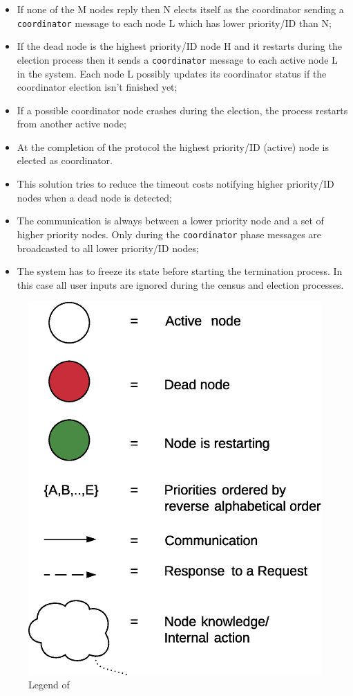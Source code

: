\begin{itemize}
  \item If none of the M nodes reply then N elects itself as the coordinator sending a \texttt{coordinator} message to each node L which has lower priority/ID than N;
  \item If the dead node is the highest priority/ID node H and it restarts during the election process then it sends a \texttt{coordinator} message to each active node L in the system. Each node L possibly updates its coordinator status if the coordinator election isn't finished yet;
  \item If a possible coordinator node crashes during the election, the process restarts from another active node;
  \item At the completion of the protocol the highest priority/ID (active) node is elected as coordinator.
  \item This solution tries to reduce the timeout costs notifying higher priority/ID nodes when a dead node is detected;
  \item The communication is always between a lower priority node and a set of higher priority nodes. Only during the \texttt{coordinator} phase messages are broadcasted to all lower priority/ID nodes;
  \item The system has to freeze its state before starting the termination process. In this case all user inputs are ignored during the census and election processes.
\end{itemize}


\begin{figure}[H]
  \centering
  \includegraphics[width=.6\columnwidth]{sections/images/solution/election_legend.eps}
  \caption{Legend of }
  \label{fig:election-protocol-legend}
\end{figure}


